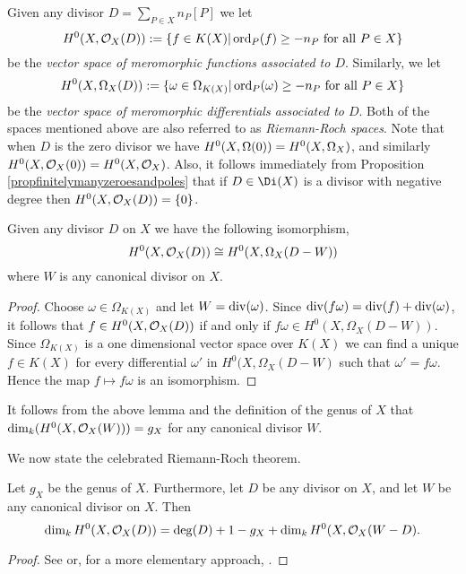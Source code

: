 Given any divisor $D = \sum_{P \in X} n_P[P]$ we let
    \[
    H^0(X,{\cal O}_X(D)) : = \{ f \in K(X) | \operatorname{ord}_P(f) \geq -n_P\ \text{for all}\ P \in X\}
    \]
be the \emph{vector space of meromorphic functions associated to $D$}.
Similarly, we let 
    \[
    H^0(X,\Omega_X(D)) :  = \{ \omega \in \Omega_{K(X)} | \operatorname{ord}_P(\omega) \geq -n_P \ \text{for all} \ P \in X\}
    \]
be the \emph{vector space of meromorphic differentials associated to $D$}.
Both of the spaces mentioned above are also referred to as \emph{Riemann-Roch spaces}.
Note that when $D$ is the zero divisor we have $H^0(X,\Omega(0)) = {H^0(X,\Omega_X)}$, and similarly $H^0(X,{\cal O}_X(0)) = H^0(X,{\cal O}_X)$.
Also, it follows immediately from Proposition \ref{propfinitelymanyzeroesandpoles} that if $D \in \Di(X)$ is a divisor with negative degree then $H^0(X,{\cal O}_X(D)) = \{0\}$.

    \begin{lem}\label{lemisomorphismofdifferentialsandfunctions}
    Given any divisor $D$ on $X$ we have the following isomorphism,
        \[
        H^0(X,{\cal O}_X(D)) \cong H^0(X,\Omega_X(D - W))
        \]
    where $W$ is any canonical divisor on $X$.
    \end{lem}
    \begin{proof}
    Choose $\omega \in \Omega_{K(X)}$ and let $W = \operatorname{div}(\omega)$.
    Since $\operatorname{div}(f \omega) = \operatorname{div}(f) + \operatorname{div}(\omega)$, it follows that $f \in H^0(X,{\cal O}_X(D))$ if and only if $f \omega \in H^0(X,\Omega_X(D - W))$.
    Since $\Omega_{K(X)}$ is a one dimensional vector space over $K(X)$ we can find a unique $f \in K(X)$ for every differential $\omega'$ in $H^0(X,\Omega_X(D - W)$ such that $\omega' = f \omega$.
    Hence the map $f \mapsto f\omega$ is an isomorphism.
    \end{proof}

It follows from the above lemma and the definition of the genus of $X$ that $\dim_k(H^0(X,{\cal O}_X(W))) = g_X$ for any canonical divisor $W$.

We now state the celebrated Riemann-Roch theorem.

    \begin{thm}\label{theoremriemannroch}
    Let $g_X$ be the genus of $X$.
    Furthermore, let $D$ be any divisor on $X$, and let $W$ be any canonical divisor on $X$.
    Then
        \[
        \dim_k H^0(X,{\cal O}_X(D)) = \deg(D) + 1 - g_X + \dim_k H^0(X,{\cal O}_X(W-D).
        \]
    \end{thm}
    \begin{proof}
    See \cite[Chap.\ IV, \S 1, Thm.\ 1.3]{hart} or, for a more elementary approach, \cite[Chap.\ 8, \S 6]{fulton}.
    \end{proof}

